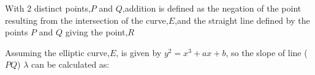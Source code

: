 \documentclass{article}
\begin{document}
With 2 distinct points,$P$ and $Q$,addition is defined as the negation of the point resulting from the intersection of the curve,$E$,and the straight line defined by the points $P$ and $Q$ giving the point,$R$

\hspace{4.3cm}
\begin{centre}
\end{centre}

Assuming the elliptic curve,$E$, is given by \(y^2=x^3+ax+b\), so the slope of line ($PQ$) $\lambda$ can be calculated as:
\hspace{3cm}
\begin{center}
\end{center}
\hspace{2.5cm}
\begin{centre}
\end{centre}
\begin{centre}
\end{centre}
\end{document}

